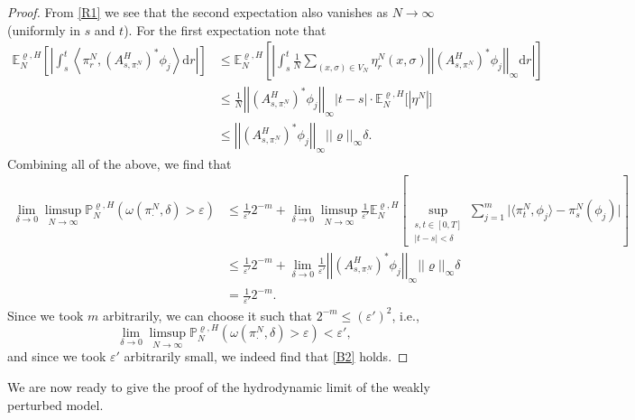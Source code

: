 \documentclass[11pt]{article}
\numberwithin{equation}{section}
\theoremstyle{definition}
\theoremstyle{plain}
\newcommand{\E}{\mathbb{E}}
\newcommand{\p}{\mathbb{P}}
\newcommand{\dd}{\mathrm{d}}
\newcommand{\nn}{\nonumber}
\begin{document}
\begin{proof}
From \eqref{R1} we see that the second expectation also vanishes as $N\to\infty$ (uniformly in $s$ and $t$). For the first expectation note that 
    \begin{align}
        \E^{\varrho,H}_N\left[\left|\int_s^t\left\langle \pi^N_{r}, \left(\!A^{H}_{s, \pi^N_\cdot}\!\right)^{\!*} \phi_j\right\rangle\dd r\right|\right] 
        &\leq \E^{\varrho,H}_N\left[\left|\int_s^t \frac{1}{N} \sum_{(x,\sigma)\in V_N}\eta_r^N(x,\sigma) \left|\left|\left(\!A^{H}_{s, \pi^N_\cdot}\!\right)^{\!*}\phi_j\right|\right|_\infty \dd r  \right|\right]\nn\\
        \nn&\leq  \frac{1}{N} \left|\left|\left(\!A^{H}_{s, \pi^N_\cdot}\!\right)^{\!*}\phi_j\right|\right|_\infty |t-s| \cdot \E^{\varrho,H}_N\big[|\eta^N|\big]\\
        &\leq \left|\left|\left(\!A^{H}_{s, \pi^N_\cdot}\!\right)^{\!*}\phi_j\right|\right|_\infty ||\varrho||_\infty \delta .
    \end{align}
Combining  all of the above, we find that 
    \begin{align}
        \lim_{\delta\to0}\limsup_{N\to\infty} \p^{\varrho,H}_N(\omega(\pi^N_{\cdot},\delta)>\varepsilon)
        &\leq  \frac{1}{\varepsilon'} 2^{-m} + \lim_{\delta\to0}\limsup_{N\to\infty} \frac{1}{\varepsilon'} \E^{\varrho,H}_N\left[\sup_{\substack{s,t\in[0,T]\\|t-s|<\delta}}\sum_{j=1}^m \big|\langle \pi^N_{t},\phi_j\rangle - \pi^N_{s}(\phi_j)\big|\right]\nn\\
        \nn&\leq \frac{1}{\varepsilon'} 2^{-m} +\lim_{\delta \to 0} \frac{1}{\varepsilon'}  \left|\left|\left(\!A^{H}_{s, \pi^N_\cdot}\!\right)^{\!*}\phi_j\right|\right|_\infty ||\varrho||_\infty \delta \\
        &= \frac{1}{\varepsilon'} 2^{-m}.
    \end{align}
Since we took $m$ arbitrarily, we can choose it such that $2^{-m} \leq (\varepsilon')^2$, i.e., 
    \begin{equation}
        \lim_{\delta\to0}\limsup_{N\to\infty} \p^{\varrho,H}_N(\omega(\pi^N_{\cdot},\delta)>\varepsilon) < \varepsilon',
    \end{equation}
and since we took $\varepsilon'$ arbitrarily small, we indeed find that \ref{B2} holds. 
\end{proof}
We are now ready to give the proof of the hydrodynamic limit of the weakly perturbed model. 
\end{document}
